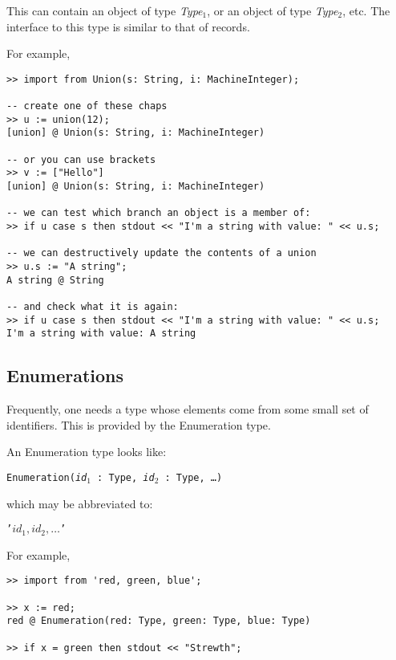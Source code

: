 \documentclass{article}
\begin{document}
This can contain an object of type {\em Type$_1$}, or an object of
type {\it Type$_2$}, etc.  The interface to this type is similar to
that of records.

For example,
\begin{small}
\begin{verbatim}
>> import from Union(s: String, i: MachineInteger);

-- create one of these chaps 
>> u := union(12);
[union] @ Union(s: String, i: MachineInteger)

-- or you can use brackets
>> v := ["Hello"]
[union] @ Union(s: String, i: MachineInteger)

-- we can test which branch an object is a member of:
>> if u case s then stdout << "I'm a string with value: " << u.s;

-- we can destructively update the contents of a union
>> u.s := "A string";
A string @ String

-- and check what it is again:
>> if u case s then stdout << "I'm a string with value: " << u.s;
I'm a string with value: A string
\end{verbatim}
\end{small}

\subsection{Enumerations}

Frequently, one needs a type whose elements come from some small set
of identifiers.   This is provided by the Enumeration type.

An Enumeration type looks like:
\begin{center}
{\tt Enumeration({\it id$_1$} : Type, {\it id$_2$} : Type, \ldots)}
\end{center}

which may be abbreviated to:
\begin{center}
{\tt '$id_1, id_2, \ldots$'}
\end{center}

For example, 
\begin{small}
\begin{verbatim}
>> import from 'red, green, blue';

>> x := red;
red @ Enumeration(red: Type, green: Type, blue: Type)

>> if x = green then stdout << "Strewth";
\end{verbatim}
\end{small}
\end{document}
